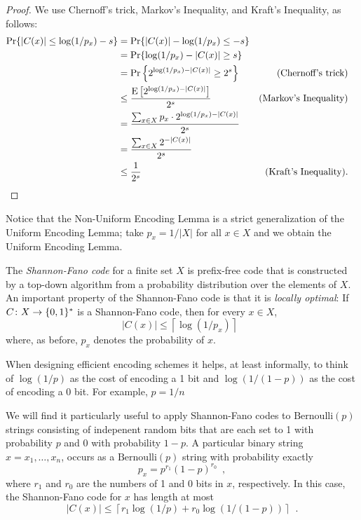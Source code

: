 \documentclass{patmorin}
\begin{document}
\begin{proof}
  We use Chernoff's trick, Markov's Inequality, and Kraft's Inequality,
  as follows: 
  \begin{align*}
     \Pr\{ |C(x)| \le\log(1/p_x)-s \} 
      & = \Pr\{|C(x)| -\log(1/p_x) \le -s \} \\
      & = \Pr\{\log(1/p_x)-|C(x)| \ge s \} \\
      & = \Pr\left\{2^{\log(1/p_x)-|C(x)|} \ge 2^s \right\} & \text{(Chernoff's trick)} \\
      & \le \frac{\mathrm{E}\left[2^{\log(1/p_x)-|C(x)|}\right]}{2^s} & \text{(Markov's Inequality)} \\
      & = \frac{\sum_{x\in X}p_x\cdot 2^{\log(1/p_x)-|C(x)|}}{2^s} \\
      & = \frac{\sum_{x\in X}2^{-|C(x)|}}{2^s} \\
      & \le \frac{1}{2^s} & \text{(Kraft's Inequality).}  & \qedhere
  \end{align*}
\end{proof}

Notice that the Non-Uniform Encoding Lemma is a strict generalization
of the Uniform Encoding Lemma; take $p_x=1/|X|$ for all $x\in X$
and we obtain the Uniform Encoding Lemma.

The \emph{Shannon-Fano code} \cite{fano:transmission,shannon:mathematical}
for a finite set $X$ is prefix-free code that is constructed by a top-down
algorithm from a probability distribution over the elements of $X$. An
important property of the Shannon-Fano code is that it is \emph{locally
optimal}: If $C\colon X\to\{0,1\}^*$ is a Shannon-Fano code, then for every $x\in X$,
\[
    |C(x)| \le \left\lceil\log(1/p_x)\right\rceil \enspace 
\]
where, as before, $p_x$ denotes the probability of $x$.

When designing efficient encoding schemes it helps, at least
informally, to think of $\log(1/p)$ as the cost of encoding a 1 bit and
$\log(1/(1-p))$ as the cost of encoding a 0 bit.  For example, $p=1/n$

We will find it particularly useful to apply Shannon-Fano codes to
$\mathrm{Bernoulli}(p)$ strings consisting of indepenent random bits that
are each set to 1 with probability $p$ and 0 with probability $1-p$.
A particular binary string $x=x_1,\ldots,x_n$, occurs as
a $\mathrm{Bernoulli}(p)$ string with
probability exactly
\[
   p_x= p^{r_1}(1-p)^{r_0} \enspace ,
\]
where $r_1$ and $r_0$ are the numbers of 1 and 0 bits in $x$, respectively. In this case, the Shannon-Fano code for $x$ has length at most
\[
    |C(x)|\le \left\lceil r_1\log (1/p) + r_0\log(1/(1-p)) \right\rceil \enspace .
\]
\end{document}
